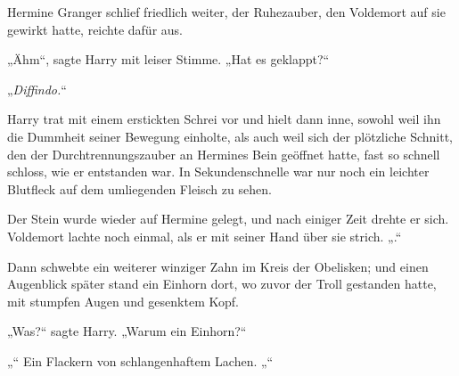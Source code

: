 Hermine Granger schlief friedlich weiter, der Ruhezauber, den Voldemort auf sie gewirkt hatte, reichte dafür aus.

„Ähm“, sagte Harry mit leiser Stimme. „Hat es geklappt?“

„\emph{Diffindo.}“

Harry trat mit einem erstickten Schrei vor und hielt dann inne, sowohl weil ihn die Dummheit seiner Bewegung einholte, als auch weil sich der plötzliche Schnitt, den der Durchtrennungszauber an Hermines Bein geöffnet hatte, fast so schnell schloss, wie er entstanden war. In Sekundenschnelle war nur noch ein leichter Blutfleck auf dem umliegenden Fleisch zu sehen.

Der Stein wurde wieder auf Hermine gelegt, und nach einiger Zeit drehte er sich.
Voldemort lachte noch einmal, als er mit seiner Hand über sie strich.
„.“

Dann schwebte ein weiterer winziger Zahn im Kreis der Obelisken; und einen Augenblick später stand ein Einhorn dort, wo zuvor der Troll gestanden hatte, mit stumpfen Augen und gesenktem Kopf.

„Was?“ sagte Harry. „Warum ein Einhorn?“

„“
Ein Flackern von schlangenhaftem Lachen.
„“

